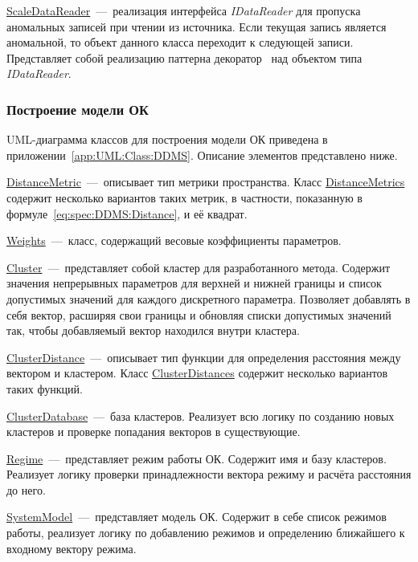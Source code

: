 \uline{ScaleDataReader}~---~реализация интерфейса \textit{IDataReader} для пропуска аномальных записей при чтении из источника. Если текущая запись является аномальной, то объект данного класса переходит к следующей записи. Представляет собой реализацию паттерна декоратор~\cite{GangOfFourDesignPatterns} над объектом типа \textit{IDataReader}.

\subsubsection{Построение модели ОК}
UML-диаграмма классов для построения модели ОК приведена в приложении~\ref{app:UML:Class:DDMS}. Описание элементов представлено ниже.

\uline{DistanceMetric}~---~описывает тип метрики пространства. Класс \uline{DistanceMetrics} содержит несколько вариантов таких метрик, в частности, показанную в формуле~\eqref{eq:spec:DDMS:Distance}, и её квадрат.

\uline{Weights}~---~класс, содержащий весовые коэффициенты параметров.

\uline{Cluster}~---~представляет собой кластер для разработанного метода. Содержит значения непрерывных параметров для верхней и нижней границы и список допустимых значений для каждого дискретного параметра. Позволяет добавлять в себя вектор, расширяя свои границы и обновляя списки допустимых значений так, чтобы добавляемый вектор находился внутри кластера.

\uline{ClusterDistance}~---~описывает тип функции для определения расстояния между вектором и кластером. Класс \uline{ClusterDistances} содержит несколько вариантов таких функций.

\uline{ClusterDatabase}~---~база кластеров. Реализует всю логику по созданию новых кластеров и проверке попадания векторов в существующие.

\uline{Regime}~---~представляет режим работы ОК. Содержит имя и базу кластеров. Реализует логику проверки принадлежности вектора режиму и расчёта расстояния до него.

\uline{SystemModel}~---~представляет модель ОК. Содержит в себе список режимов работы, реализует логику по добавлению режимов и определению ближайшего к входному вектору режима.

\FloatBarrier